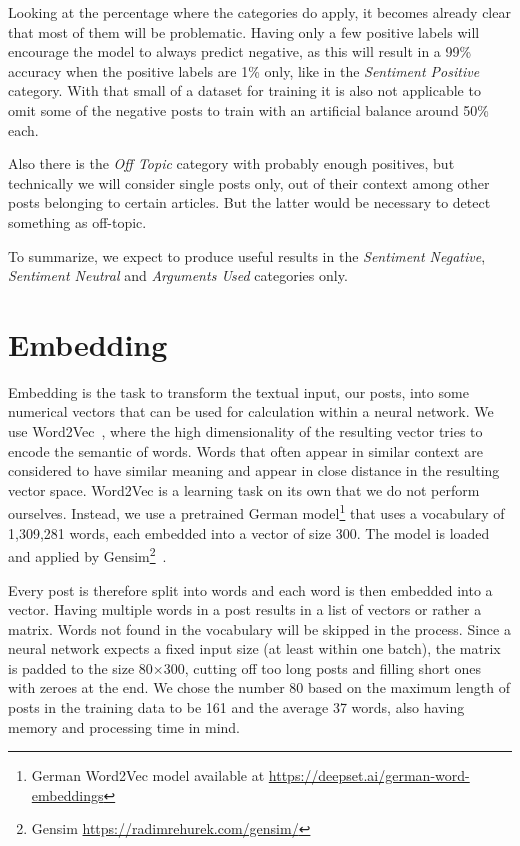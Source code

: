 \documentclass[11pt,a4paper]{article}
\begin{document}
Looking at the percentage where the categories do apply, it becomes already clear that most of them will be problematic. 
Having only a few positive labels will encourage the model to always predict negative, as this will result in a 99\% accuracy when the positive labels are 1\% only, like in the \textit{Sentiment Positive} category. With that small of a dataset for training it is also not applicable to omit some of the negative posts to train with an artificial balance around 50\% each.

Also there is the \textit{Off Topic} category with probably enough positives, but technically we will consider single posts only, out of their context among other posts belonging to certain articles. But the latter would be necessary to detect something as off-topic.

To summarize, we expect to produce useful results in the \textit{Sentiment Negative}, \textit{Sentiment Neutral} and \textit{Arguments Used} categories only.

\section{Embedding}

Embedding is the task to transform the textual input, our posts, into some numerical vectors that can be used for calculation within a neural network. 
We use Word2Vec~\cite{word2vec}, where the high dimensionality of the resulting vector tries to encode the semantic of words. 
Words that often appear in similar context are considered to have similar meaning and appear in close distance in the resulting vector space.
Word2Vec is a learning task on its own that we do not perform ourselves. Instead, we use a pretrained German model\footnote{German Word2Vec model available at \url{https://deepset.ai/german-word-embeddings}} that uses a vocabulary of 1,309,281 words, each embedded into a vector of size 300.
The model is loaded and applied by Gensim\footnote{Gensim \url{https://radimrehurek.com/gensim/}}~\cite{gensim}.

Every post is therefore split into words and each word is then embedded into a vector. Having multiple words in a post results in a list of vectors or rather a matrix. 
Words not found in the vocabulary will be skipped in the process. 
Since a neural network expects a fixed input size (at least within one batch), the matrix is padded to the size 80$\times$300, cutting off too long posts and filling short ones with zeroes at the end. 
We chose the number 80 based on the maximum length of posts in the training data to be 161 and the average 37 words, also having memory and processing time in mind.
\end{document}
